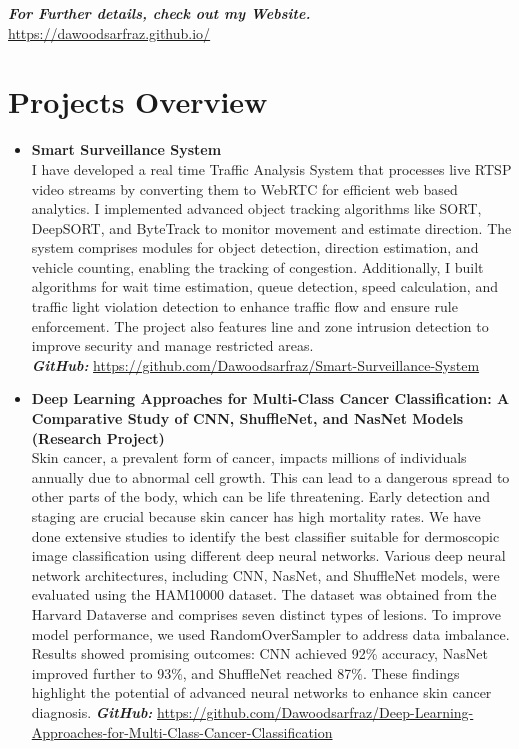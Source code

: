 \documentclass[a4paper,12pt]{article}
\begin{document}
\textbf{\textit{For Further details, check out my Website.}} \href{https://dawoodsarfraz.github.io/}{https://dawoodsarfraz.github.io/}


\newpage
\section*{Projects Overview}
\vspace{-2pt}

\begin{itemize}
\item \textbf{Smart Surveillance System} \\
I have developed a real time Traffic Analysis System that processes live RTSP video streams by converting them to WebRTC for efficient web based analytics. I implemented advanced object tracking algorithms like SORT, DeepSORT, and ByteTrack to monitor movement and estimate direction. The system comprises modules for object detection, direction estimation, and vehicle counting, enabling the tracking of congestion. Additionally, I built algorithms for wait time estimation, queue detection, speed calculation, and traffic light violation detection to enhance traffic flow and ensure rule enforcement. The project also features line and zone intrusion detection to improve security and manage restricted areas. \\
\textbf{\textit{GitHub:}} \href{https://github.com/Dawoodsarfraz/Smart-Surveillance-System}{https://github.com/Dawoodsarfraz/Smart-Surveillance-System}

\item \textbf{Deep Learning Approaches for Multi-Class Cancer Classification: A Comparative Study of CNN, ShuffleNet, and NasNet Models (Research Project)} \\
Skin cancer, a prevalent form of cancer, impacts millions of individuals annually due to abnormal cell growth. This can lead to a dangerous spread to other parts of the body, which can be life threatening. Early detection and staging are crucial because skin cancer has high mortality rates. We have done extensive studies to identify the best classifier suitable for dermoscopic image classification using different deep neural networks. Various deep neural network architectures, including CNN, NasNet, and ShuffleNet models, were evaluated using the HAM10000 dataset. The dataset was obtained from the Harvard Dataverse and comprises seven distinct types of lesions. To improve model performance, we used RandomOverSampler to address data imbalance. Results showed promising outcomes: CNN achieved 92\% accuracy, NasNet improved further to 93\%, and ShuffleNet reached 87\%. These findings highlight the potential of advanced neural networks to enhance skin cancer diagnosis. \newline
\textbf{\textit{GitHub:}} \url{https://github.com/Dawoodsarfraz/Deep-Learning-Approaches-for-Multi-Class-Cancer-Classification}


\end{itemize}
\end{document}
